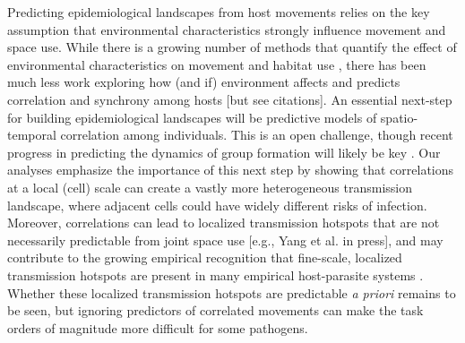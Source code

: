 \documentclass[letterpaper]{article}
\begin{document}
Predicting epidemiological landscapes from host movements relies on the key assumption that environmental characteristics strongly influence movement and space use. While there is a growing number of methods that quantify the effect of environmental characteristics on movement and habitat use \citep[reviewed in][]{Hooten2017a}, there has been much less work exploring how (and if) environment affects and predicts correlation and synchrony among hosts [but see citations].  An essential next-step for building epidemiological landscapes will be predictive models of spatio-temporal correlation among individuals.  This is an open challenge, though recent progress in predicting the dynamics of group formation will likely be key \citep[e.g.][]{Brandell2021}.
Our analyses emphasize the importance of this next step by showing that correlations at a local (cell) scale can create a vastly more heterogeneous transmission landscape, where adjacent cells could have widely different risks of infection.  Moreover, correlations can lead to localized transmission hotspots that are not necessarily predictable from joint space use [e.g., Yang et al. in press], and may contribute to the growing empirical recognition that fine-scale, localized transmission hotspots are present in many empirical host-parasite systems \citep{Albery2021}.  Whether these localized transmission hotspots are predictable \emph{a priori} remains to be seen, but ignoring predictors of correlated movements can make the task orders of magnitude more difficult for some pathogens.

\end{document}
